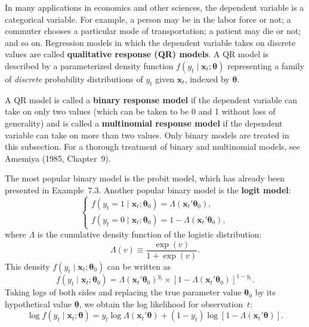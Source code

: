 
In many applications in economics and other sciences, the dependent variable is
a categorical variable. For example, a person may be in the labor force or not;
a commuter chooses a particular mode of transportation; a patient may die or not;
and so on. Regression models in which the dependent variable takes on discrete
values are called \textbf{qualitative response (QR) models}. A QR model is described
by a parameterized density function $f(y_t \mid \mathbf{x}_t; \boldsymbol{\theta})$ representing a family of \emph{discrete}
probability distributions of $y_t$ given $\mathbf{x}_t$, indexed by $\boldsymbol{\theta}$.

A QR model is called a \textbf{binary response model} if the dependent variable can
take on only two values (which can be taken to be 0 and 1 without loss of generality)
and is called a \textbf{multinomial response model} if the dependent variable can
take on more than two values. Only binary models are treated in this subsection.
For a thorough treatment of binary and multinomial models, see Amemiya (1985,
Chapter~9).

The most popular binary model is the probit model, which has already
been presented in Example~7.3. Another popular binary model is the \textbf{logit model}:
\begin{equation}
  \begin{cases}
    f(y_t = 1 \mid \mathbf{x}_t; \boldsymbol{\theta}_0) = \Lambda(\mathbf{x}_t'\boldsymbol{\theta}_0), \\
    f(y_t = 0 \mid \mathbf{x}_t; \boldsymbol{\theta}_0) = 1 - \Lambda(\mathbf{x}_t'\boldsymbol{\theta}_0),
  \end{cases}
  \label{eq:8.1.1} \tag{8.1.1}
\end{equation}
where $\Lambda$ is the cumulative density function of the logistic distribution:
\begin{equation}
  \Lambda(v) \equiv \frac{\exp(v)}{1 + \exp(v)}.
  \label{eq:8.1.2} \tag{8.1.2}
\end{equation}
This density $f(y_t \mid \mathbf{x}_t; \boldsymbol{\theta}_0)$ can be written as
\begin{equation}
  f(y_t \mid \mathbf{x}_t; \boldsymbol{\theta}_0)
  = \Lambda(\mathbf{x}_t'\boldsymbol{\theta}_0)^{y_t}
    \times [1 - \Lambda(\mathbf{x}_t'\boldsymbol{\theta}_0)]^{1-y_t}.
  \label{eq:8.1.3} \tag{8.1.3}
\end{equation}
Taking logs of both sides and replacing the true parameter value $\boldsymbol{\theta}_0$ by its
hypothetical value $\boldsymbol{\theta}$, we obtain the log likelihood for observation~$t$:
\begin{equation}
  \log f(y_t \mid \mathbf{x}_t; \boldsymbol{\theta})
  = y_t \log \Lambda(\mathbf{x}_t'\boldsymbol{\theta})
    + (1 - y_t) \log[1 - \Lambda(\mathbf{x}_t'\boldsymbol{\theta})].
  \label{eq:8.1.4} \tag{8.1.4}
\end{equation}

